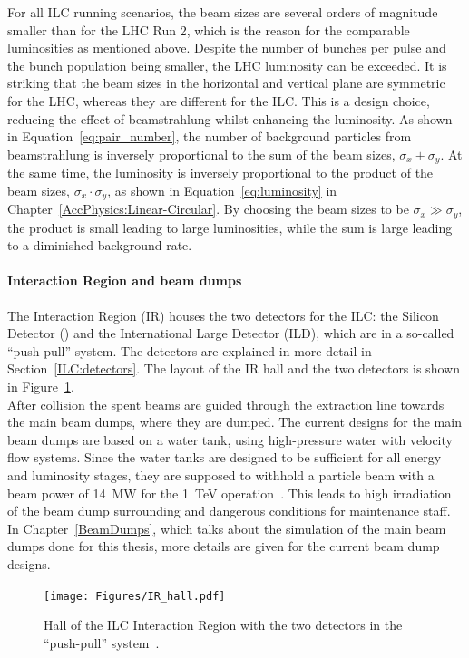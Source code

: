 For all ILC running scenarios, the beam sizes are several orders of magnitude smaller than for the LHC Run 2, which is the reason for the comparable luminosities as mentioned above.
Despite the number of bunches per pulse and the bunch population being smaller, the LHC luminosity can be exceeded.
It is striking that the beam sizes in the horizontal and vertical plane are symmetric for the LHC, whereas they are different for the ILC.
This is a design choice, reducing the effect of beamstrahlung whilst enhancing the luminosity.
As shown in Equation~\ref{eq:pair_number}, the number of background particles from beamstrahlung is inversely proportional to the sum of the beam sizes, $\sigma_x+\sigma_y$.
At the same time, the luminosity is inversely proportional to the product of the beam sizes, $\sigma_x\cdot\sigma_y$, as shown in Equation~\ref{eq:luminosity} in Chapter~\ref{AccPhysics:Linear-Circular}.
By choosing the beam sizes to be $\sigma_x\gg\sigma_y$, the product is small leading to large luminosities, while the sum is large leading to a diminished background rate.

\paragraph{Interaction Region and beam dumps}
The Interaction Region (IR) houses the two detectors for the ILC: the Silicon Detector (\sid) and the International Large Detector (ILD), which are in a so-called ``push-pull'' system.
The detectors are explained in more detail in Section~\ref{ILC:detectors}.
The layout of the IR hall and the two detectors is shown in Figure~\ref{fig:ILC_IRhall}.
\\After collision the spent beams are guided through the extraction line towards the main beam dumps, where they are dumped.
The current designs for the main beam dumps are based on a water tank, using high-pressure water with velocity flow systems.
Since the water tanks are designed to be sufficient for all energy and luminosity stages, they are supposed to withhold a particle beam with a beam power of \SI{14}{\mega\watt} for the \SI{1}{\TeV} operation~\cite[p. 18]{TDR32}.
This leads to high irradiation of the beam dump surrounding and dangerous conditions for maintenance staff.
In Chapter~\ref{BeamDumps}, which talks about the simulation of the main beam dumps done for this thesis, more details are given for the current beam dump designs.
\begin{figure}[htbp]
\centering
\texttt{[image: Figures/IR\_hall.pdf]}
\caption[ILC Interaction Region]{Hall of the ILC Interaction Region with the two detectors in the ``push-pull'' system~\cite[p. 29]{TDR1}.}
\label{fig:ILC_IRhall}
\end{figure}

